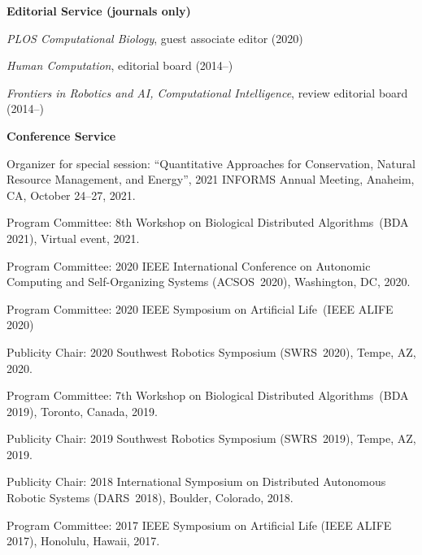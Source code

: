 \documentclass[10pt]{article}
\newcommand{\halfblankline}{\quad\vspace{-0.5\baselineskip}\pagebreak[3]}
\begin{document}
\halfblankline

\textbf{Editorial Service (journals only)}
\begin{innerlist}
    \item \emph{PLOS Computational Biology}, guest associate editor (2020)
    \item \emph{Human Computation}, editorial board (2014--)
    \item \emph{Frontiers in Robotics and AI, Computational Intelligence}, review editorial board (2014--)
\end{innerlist}

\halfblankline

\textbf{Conference Service}
\begin{bibsection}[\enskip\textbullet,leftmargin=*]
    \item Organizer for special session: ``Quantitative Approaches for
        Conservation, Natural Resource Management, and Energy'', 2021
        INFORMS Annual Meeting, Anaheim, CA, October 24--27, 2021.

    \item Program Committee: 8th Workshop on Biological Distributed
        Algorithms~(BDA 2021), Virtual event, 2021.

    \item Program Committee: 2020 IEEE International Conference on
        Autonomic Computing and Self-Organizing Systems (ACSOS~2020),
        Washington, DC, 2020.

    \item Program Committee: 2020 IEEE Symposium on Artificial
        Life~(IEEE ALIFE 2020)

    \item Publicity Chair: 2020 Southwest Robotics Symposium
        (SWRS~2020), Tempe, AZ, 2020.

    \item Program Committee: 7th Workshop on Biological Distributed
        Algorithms~(BDA 2019), Toronto, Canada, 2019.

    \item Publicity Chair: 2019 Southwest Robotics Symposium
        (SWRS~2019), Tempe, AZ, 2019.

    \item Publicity Chair: 2018 International Symposium on Distributed
        Autonomous Robotic Systems (DARS~2018), Boulder, Colorado, 2018.

    \item Program Committee: 2017 IEEE Symposium on Artificial Life
        (IEEE ALIFE 2017), Honolulu, Hawaii, 2017.


\end{bibsection}
\end{document}
